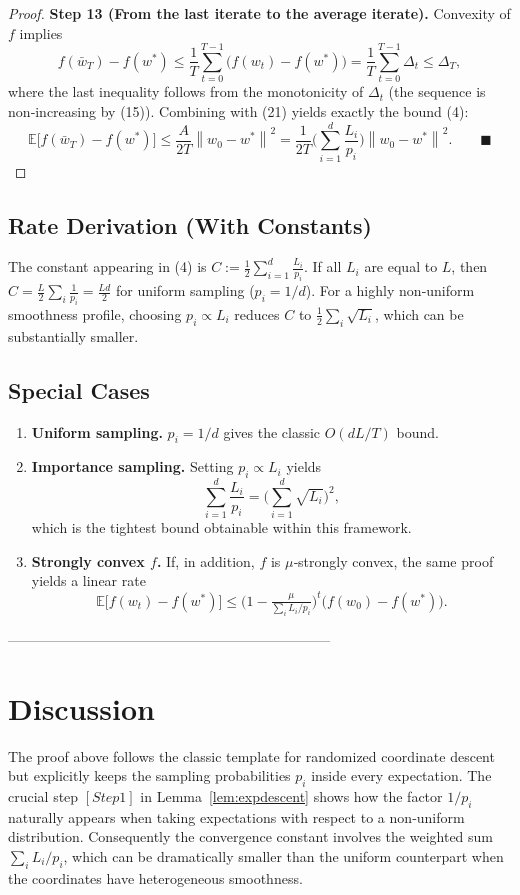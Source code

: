 \documentclass{article}
\newcommand{\E}{\mathbb{E}}
\newcommand{\norm}[1]{\left\|#1\right\|}
\begin{document}
\begin{proof}
\textbf{Step 13 (From the last iterate to the average iterate).}  
Convexity of $f$ implies
\[
f(\bar w_T)-f(w^{*})\le \frac{1}{T}\sum_{t=0}^{T-1}\big(f(w_t)-f(w^{*})\big)
   =\frac{1}{T}\sum_{t=0}^{T-1}\Delta_t
   \le \Delta_T,
\]
where the last inequality follows from the monotonicity of $\Delta_t$ (the sequence is non‑increasing by (15)).  Combining with (21) yields exactly the bound (4):
\[
\E\!\big[f(\bar w_T)-f(w^{*})\big]\le
\frac{A}{2T}\norm{w_0-w^{*}}^{2}
=\frac{1}{2T}\Big(\sum_{i=1}^{d}\frac{L_i}{p_i}\Big)
   \norm{w_0-w^{*}}^{2}.
\qquad\blacksquare
\]
\end{proof}

\subsection*{Rate Derivation (With Constants)}
The constant appearing in (4) is $C:=\frac{1}{2}\sum_{i=1}^{d}\frac{L_i}{p_i}$.  If all $L_i$ are equal to $L$, then $C=\frac{L}{2}\sum_i\frac{1}{p_i}= \frac{L d}{2}$ for uniform sampling ($p_i=1/d$).  For a highly non‑uniform smoothness profile, choosing $p_i\propto L_i$ reduces $C$ to $\frac{1}{2}\sum_i \sqrt{L_i}$, which can be substantially smaller.

\subsection*{Special Cases}
\begin{enumerate}
\item \textbf{Uniform sampling.}  $p_i=1/d$ gives the classic $O(dL/T)$ bound.
\item \textbf{Importance sampling.}  Setting $p_i\propto L_i$ yields
\[
\sum_{i=1}^{d}\frac{L_i}{p_i}= \Big(\sum_{i=1}^{d}\sqrt{L_i}\Big)^{2},
\]
which is the tightest bound obtainable within this framework.
\item \textbf{Strongly convex $f$.}  If, in addition, $f$ is $\mu$‑strongly convex,
the same proof yields a linear rate
\[
\E\!\big[f(w_t)-f(w^{*})\big]\le
\big(1-\tfrac{\mu}{\sum_i L_i/p_i}\big)^{t}\big(f(w_0)-f(w^{*})\big).
\]
\end{enumerate}

---------------------------------------------------------------------

\section*{Discussion}
The proof above follows the classic template for randomized coordinate descent but explicitly keeps the sampling probabilities $p_i$ inside every expectation.  The crucial step \([Step 1]\) in Lemma~\ref{lem:expdescent} shows how the factor $1/p_i$ naturally appears when taking expectations with respect to a non‑uniform distribution.  Consequently the convergence constant involves the weighted sum $\sum_i L_i/p_i$, which can be dramatically smaller than the uniform counterpart when the coordinates have heterogeneous smoothness.
\end{document}
